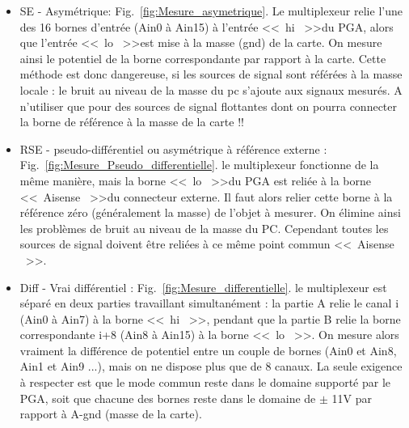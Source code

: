 \begin{itemize}\itemsep1pt
\renewcommand{\labelitemi}{$\bullet$}
\item SE - Asymétrique: Fig.~\ref{fig:Mesure_asymetrique}. Le multiplexeur relie l'une des 16 bornes d'entrée (Ain0 à Ain15) à l'entrée \textless\textless\ hi \ \textgreater\textgreater du PGA, alors que l'entrée \textless\textless\ lo \ \textgreater\textgreater est mise à la masse (gnd) de la carte. On mesure ainsi le potentiel de la borne correspondante par rapport  à la carte. Cette méthode est donc dangereuse, si les sources de signal sont référées à la masse locale : le bruit au niveau de la masse du pc s'ajoute aux signaux mesurés. A n'utiliser que pour des sources de signal flottantes dont on pourra connecter la borne de référence à la masse de la carte !!
\item RSE - pseudo-différentiel ou asymétrique à référence externe : Fig.~\ref{fig:Mesure_Pseudo_differentielle}. le multiplexeur fonctionne de la même manière, mais la borne \textless\textless\ lo \ \textgreater\textgreater du PGA est reliée à la borne \textless\textless\ Aisense \ \textgreater\textgreater du connecteur externe. Il faut alors relier cette borne à la référence zéro (généralement la masse) de l'objet à mesurer. On élimine ainsi les problèmes de bruit au niveau de la masse du PC. Cependant toutes les sources de signal doivent être reliées à ce même point commun \textless\textless\ Aisense \ \textgreater\textgreater.
\item Diff - Vrai différentiel : Fig.~\ref{fig:Mesure_differentielle}. le multiplexeur est séparé en deux parties travaillant simultanément : la partie A relie le canal i (Ain0 à Ain7) à la borne \textless\textless\ hi \ \textgreater\textgreater, pendant que la partie B relie la borne correspondante i+8 (Ain8 à Ain15) à la borne \textless\textless\ lo \ \textgreater\textgreater. On mesure alors vraiment la différence de potentiel entre un couple de bornes (Ain0 et Ain8, Ain1 et Ain9 ...), mais on ne dispose plus que de 8 canaux. La seule exigence à respecter est que le mode commun reste dans le domaine supporté par le PGA, soit que chacune des bornes reste dans le domaine de $\pm$ 11V par rapport à A-gnd (masse de la carte).
\end{itemize}

